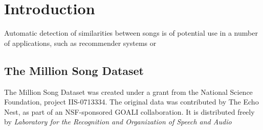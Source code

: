 \section{Introduction} %
\label{sec:introduction}
Automatic detection of similarities between songs is of potential use in a number of applications, such as recommender systems or
\subsection{The Million Song Dataset} %
\label{sub:the_million_song_dataset}
The Million Song Dataset was created under a grant from the National Science Foundation, project IIS-0713334. The original data was contributed by The Echo Nest, as part of an NSF-sponsored GOALI collaboration. It is distributed freely by \textit{Laboratory for the Recognition and Organization of Speech and Audio}
